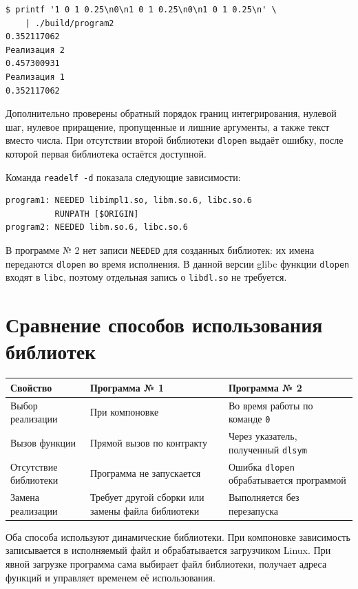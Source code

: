 \documentclass[12pt,a4paper]{article}
\begin{document}
\begin{verbatim}
$ printf '1 0 1 0.25\n0\n1 0 1 0.25\n0\n1 0 1 0.25\n' \
    | ./build/program2
0.352117062
Реализация 2
0.457300931
Реализация 1
0.352117062
\end{verbatim}

Дополнительно проверены обратный порядок границ интегрирования, нулевой шаг,
нулевое приращение, пропущенные и лишние аргументы, а также текст вместо
числа. При отсутствии второй библиотеки \texttt{dlopen} выдаёт ошибку, после
которой первая библиотека остаётся доступной.

Команда \texttt{readelf -d} показала следующие зависимости:

\begin{verbatim}
program1: NEEDED libimpl1.so, libm.so.6, libc.so.6
          RUNPATH [$ORIGIN]
program2: NEEDED libm.so.6, libc.so.6
\end{verbatim}

В программе № 2 нет записи \texttt{NEEDED} для созданных библиотек: их имена
передаются \texttt{dlopen} во время исполнения. В данной версии glibc функции
\texttt{dlopen} входят в \texttt{libc}, поэтому отдельная запись о
\texttt{libdl.so} не требуется.

\section{Сравнение способов использования библиотек}

\begin{center}
\small
\begin{tabular}{|p{41mm}|p{50mm}|p{50mm}|}
\hline
Свойство & Программа № 1 & Программа № 2 \\
\hline
Выбор реализации & При компоновке & Во время работы по команде \texttt{0} \\
\hline
Вызов функции & Прямой вызов по контракту & Через указатель, полученный \texttt{dlsym} \\
\hline
Отсутствие библиотеки & Программа не запускается & Ошибка \texttt{dlopen} обрабатывается программой \\
\hline
Замена реализации & Требует другой сборки или замены файла библиотеки & Выполняется без перезапуска \\
\hline
\end{tabular}
\end{center}

Оба способа используют динамические библиотеки. При компоновке зависимость
записывается в исполняемый файл и обрабатывается загрузчиком Linux. При
явной загрузке программа сама выбирает файл библиотеки, получает адреса
функций и управляет временем её использования.
\end{document}
